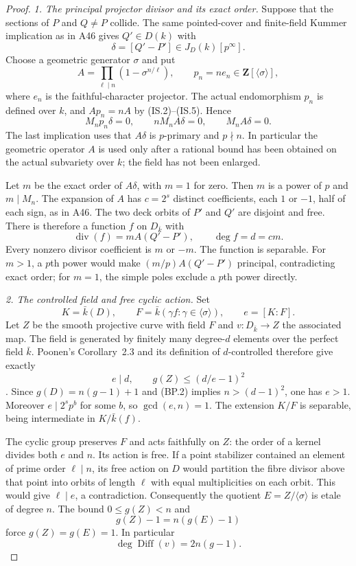 \begin{proof}
\emph{1. The principal projector divisor and its exact order.}
Suppose that the sections of $P$ and $Q\ne P$ collide.
The same pointed-cover and finite-field Kummer implication as
in A46 gives $Q'\in D(k)$ with
\[
                 \delta=[Q'-P']\in J_D(k)[p^\infty].
 \tag{BP.4}
\]
Choose a geometric generator $\sigma$ and put
\[
 A=\prod_{\ell\mid n}(1-\sigma^{n/\ell}),\qquad
 p_n=ne_n\in\mathbf Z[\langle\sigma\rangle],
 \tag{BP.5}
\]
where $e_n$ is the faithful-character projector. The actual
endomorphism $p_n$ is defined over $k$, and $Ap_n=nA$ by
(IS.2)--(IS.5). Hence
\[
 M_np_n\delta=0,\qquad nM_nA\delta=0,
                         \qquad M_nA\delta=0.
 \tag{BP.6}
\]
The last implication uses that $A\delta$ is $p$-primary and
$p\nmid n$. In particular the geometric operator $A$ is used
only after a rational bound has been obtained on the actual
subvariety over $k$; the field has not been enlarged.

Let $m$ be the exact order of $A\delta$, with $m=1$ for zero.
Then $m$ is a power of $p$ and $m\mid M_n$. The expansion of
$A$ has $c=2^s$ distinct coefficients, each $1$ or $-1$, half
of each sign, as in A46. The two deck orbits of $P'$ and $Q'$
are disjoint and free. There is therefore a function $f$ on
$D_{\bar k}$ with
\[
 \operatorname{div}(f)=mA(Q'-P'),\qquad \deg f=d=cm.
 \tag{BP.7}
\]
Every nonzero divisor coefficient is $m$ or $-m$.
The function is separable. For $m>1$, a $p$th power would
make $(m/p)A(Q'-P')$ principal, contradicting exact order;
for $m=1$, the simple poles exclude a $p$th power directly.

\emph{2. The controlled field and free cyclic action.}
Set
\[
 K=\bar k(D),\qquad
 F=\bar k(\gamma f:\gamma\in\langle\sigma\rangle),
                  \qquad e=[K:F].
\]
Let $Z$ be the smooth projective curve with field $F$ and
$v:D_{\bar k}\to Z$ the associated map. The field is generated
by finitely many degree-$d$ elements over the perfect field
$\bar k$. Poonen's Corollary~2.3 and its definition of
$d$-controlled therefore give exactly
\[
                 e\mid d,\qquad g(Z)\le(d/e-1)^2
 \tag{BP.8}
\]
\cite[Proposition~2.1, Lemma~2.2 and Corollary~2.3]{Poonen2007Gonality}.
Since $g(D)=n(g-1)+1$ and (BP.2) implies $n>(d-1)^2$,
one has $e>1$. Moreover $e\mid2^sp^b$ for some $b$, so
$\gcd(e,n)=1$. The extension $K/F$ is separable, being
intermediate in $K/\bar k(f)$.

The cyclic group preserves $F$ and acts faithfully on $Z$:
the order of a kernel divides both $e$ and $n$.
Its action is free. If a point stabilizer contained an element
of prime order $\ell\mid n$, its free action on $D$ would
partition the fibre divisor above that point into orbits of
length $\ell$ with equal multiplicities on each orbit.
This would give $\ell\mid e$, a contradiction.
Consequently the quotient $E=Z/\langle\sigma\rangle$ is etale
of degree $n$. The bound $0\le g(Z)<n$ and
\[
                         g(Z)-1=n(g(E)-1)
\]
force $g(Z)=g(E)=1$. In particular
\[
                 \deg\operatorname{Diff}(v)=2n(g-1).
 \tag{BP.9}
\]


\end{proof}
